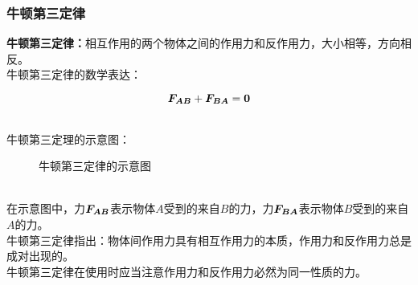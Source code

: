 \documentclass[UTF8]{ctexart}
\newcommand*{\veb}[1]{\vb*{#1}}
\begin{document}
\subsubsection{牛顿第三定律}
    \textbf{牛顿第三定律：}相互作用的两个物体之间的作用力和反作用力，大小相等，方向相反。\\[3mm]
    牛顿第三定律的数学表达：
    \begin{large}
        \begin{equation*}
            \veb{F_{AB}}+\veb{F_{BA}}=\veb{0}
        \end{equation*}
    \end{large}\\
    牛顿第三定理的示意图：
    \begin{figure}[h]
        \begin{center}
            \caption{牛顿第三定律的示意图}
        \end{center}
    \end{figure}\\
    在示意图中，力$\veb{F_{AB}}$表示物体$A$受到的来自$B$的力，力$\veb{F_{BA}}$表示物体$B$受到的来自$A$的力。\\[3mm]
    牛顿第三定律指出：物体间作用力具有相互作用力的本质，作用力和反作用力总是成对出现的。\\[3mm]
    牛顿第三定律在使用时应当注意作用力和反作用力必然为同一性质的力。

\newpage
\end{document}
